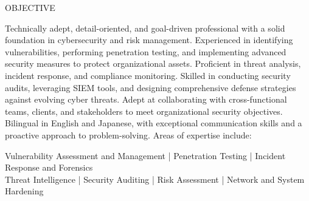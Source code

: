 \documentclass{resume} %
\begin{document}
\begin{rSection}{OBJECTIVE}

{Technically adept, detail-oriented, and goal-driven professional with a solid foundation in cybersecurity and risk management. Experienced in identifying vulnerabilities, performing penetration testing, and implementing advanced security measures to protect organizational assets. Proficient in threat analysis, incident response, and compliance monitoring. Skilled in conducting security audits, leveraging SIEM tools, and designing comprehensive defense strategies against evolving cyber threats. Adept at collaborating with cross-functional teams, clients, and stakeholders to meet organizational security objectives. Bilingual in English and Japanese, with exceptional communication skills and a proactive approach to problem-solving. Areas of expertise include:}

\vspace{3mm}
\begin{center}
    Vulnerability Assessment and Management | Penetration Testing | Incident Response and Forensics \\
    Threat Intelligence | Security Auditing | Risk Assessment | Network and System Hardening
\end{center}

\end{rSection}
\end{document}
